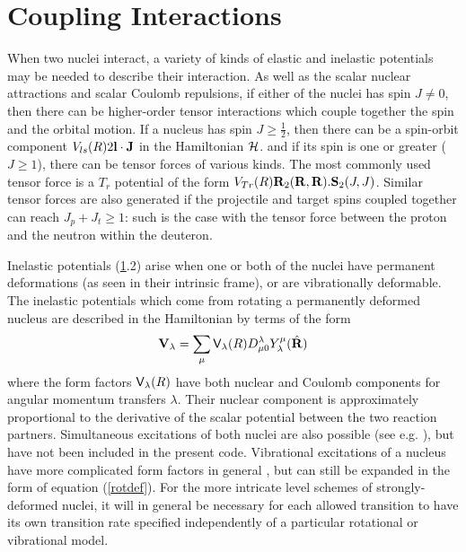 \documentclass[11pt,a4paper]{article}
\newcommand{\vecR}{{\bf R}}
\newcommand{\vecl}{{\bf l}}
\newcommand{\vecJ}{{\bf J}}
\newcommand{\Vee}{{\sf V}}
\newcommand{\half}{\frac{1}{2}}
\begin{document}
\section{Coupling Interactions}
\label{potls}

When two nuclei interact, a variety of kinds of elastic and inelastic
potentials may be needed to describe their interaction.
As well as the scalar nuclear attractions and scalar Coulomb repulsions,
if either of the nuclei has spin $ J \neq 0$, then there can be
higher-order tensor interactions which couple together the spin and the
orbital motion. If a nucleus has spin $ J \geq\half$, then there can be
a spin-orbit component $ V_{ls} (R) 2 \vecl \cdot \vecJ $ in the
Hamiltonian ${\cal H}$. and if its spin is one or greater
($J \geq 1$), there can be tensor forces of various kinds.
The most commonly used tensor force is a $ T_r $ potential
of the form
$V_{Tr} (R) {\bf R}_2 ( \vecR , \vecR ) {\bf .S}_2 (J,J) $.
Similar tensor forces are also generated if the projectile and target
spins coupled together can reach $J_p + J_t \geq 1 $:
such is the case with the tensor force between the proton and the neutron
within the deuteron.

Inelastic potentials (\ref{potls}.2) arise when one or both of the
nuclei have permanent deformations (as seen in their intrinsic frame),
or are vibrationally deformable. The inelastic potentials which come from
rotating a permanently deformed nucleus are described in the Hamiltonian
by terms of the form
\begin{eqnarray} \label{rotdef}
{\bf V}_\lambda =   \sum _ \mu \Vee_\lambda (R) D^\lambda_{\mu 0}
         Y^\mu_\lambda (\hat \vecR)
\end{eqnarray}
where the form factors $\Vee_\lambda (R)$ have both nuclear and
Coulomb components for angular momentum transfers $\lambda$.
Their nuclear component is approximately proportional
to the derivative of the scalar potential between the two reaction
partners. Simultaneous excitations of both nuclei are also possible
(see e.g. \cite{iman69}), but have not been included in the present code.
Vibrational excitations of a nucleus have more complicated form factors in
general \cite{TAM65}, but can still be expanded in the form of
equation (\ref{rotdef}).
For the more intricate level schemes of strongly-deformed nuclei, it will
in general be necessary for each allowed transition to have  its own
transition rate specified independently of a particular rotational or
vibrational model.
\end{document}
